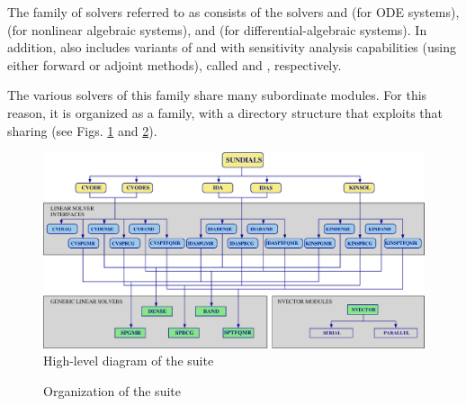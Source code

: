 %
The family of solvers referred to as {\sundials} consists of the solvers
{\cvode} and {\arkode} (for ODE systems), {\kinsol} (for nonlinear algebraic
systems), and {\ida} (for differential-algebraic systems).  In addition,
{\sundials} also includes variants of {\cvode} and {\ida} with sensitivity analysis 
capabilities (using either forward or adjoint methods), called {\cvodes} and
{\idas}, respectively.

The various solvers of this family share many subordinate modules.
For this reason, it is organized as a family, with a directory
structure that exploits that sharing (see Figs. \ref{f:sunorg1} and \ref{f:sunorg2}).
\begin{figure}
{\centerline{\includegraphics[width=\textwidth]{sunorg1}}}
\caption {High-level diagram of the {\sundials} suite}\label{f:sunorg1}
\end{figure}
\begin{figure}
\caption {Organization of the {\sundials} suite}\label{f:sunorg2}
\end{figure}
